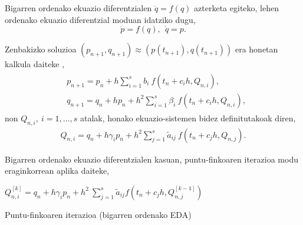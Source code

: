 Bigarren ordenako ekuazio diferentzialen $\ddot{q}=f(q)$ azterketa egiteko, lehen ordenako ekuazio diferentzial moduan idatziko dugu,
\begin{equation*}
\dot{p}=f(q), \ \ \dot{q}=p.
\end{equation*}

Zenbakizko soluzioa $(p_{n+1},q_{n+1}) \approx (p(t_{n+1}),q(t_{n+1}))$ era honetan kalkula daiteke \cite{JMSanz-Serna1994},
\begin{align}
\begin{split}
&p_{n+1}=p_n+ h \sum\limits_{i=1}^{s} b_i \ f(t_n+c_ih,Q_{n,i}),\\
&q_{n+1}=q_n+ h p_{n} + h^2 \sum\limits_{i=1}^{s} \beta_i \ f(t_n+c_ih,Q_{n,i}),
\end{split}
\end{align}
%
non $Q_{n,i}, \ i=1,\dots,s$ atalak, honako ekuazio-sistemen bidez definitutakoak diren, 
\begin{align}
Q_{n,i}=q_n+ h\gamma_i p_n+ h^2 \sum\limits_{j=1}^{s} \tilde{a}_{ij} \ f(t_n+c_jh,Q_{n,j}).
\end{align}

Bigarren ordenako ekuazio diferentzialen kasuan, puntu-finkoaren iterazioa modu eraginkorrean aplika daiteke,

\begin{algorithm}[H]
  {
   $Q_{n,i}^{[k]}=q_{n}+h \gamma_i p_{n}+ h^2 \ \sum\limits_{j=1}^{s} \tilde{a}_{ij} f(t_n+c_jh,Q_{n,j}^{[k-1]}) $\;  
  }
 \caption{Puntu-finkoaren iterazioa (bigarren ordenako EDA)}
\end{algorithm} 

%


